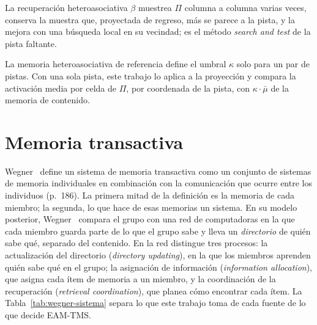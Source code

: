 La recuperación heteroasociativa $\beta$ muestrea $\Pi$ columna a columna varias veces,
conserva la muestra que, proyectada de regreso, más se parece a la pista, y la mejora
con una búsqueda local en su vecindad; es el método \emph{search and test} de la pista
faltante.

La memoria heteroasociativa de referencia define el umbral $\kappa$ solo para un par de
pistas.
Con una sola pista, este trabajo lo aplica a la proyección y compara la activación media
por celda de $\Pi$, por coordenada de la pista, con $\kappa \cdot \bar{\mu}$ de la
memoria de contenido.

\section{Memoria transactiva}
\label{sec:tmt}

Wegner~\cite{wegner1987transactive} define un sistema de memoria transactiva como un
conjunto de sistemas de memoria individuales en combinación con la comunicación que
ocurre entre los individuos (p.~186).
La primera mitad de la definición es la memoria de cada miembro; la segunda, lo que
hace de esas memorias un sistema.
En su modelo posterior, Wegner~\cite{wegner1995computer} compara el grupo con una red
de computadoras en la que cada miembro guarda parte de lo que el grupo sabe y lleva un
\emph{directorio} de quién sabe qué, separado del contenido.
En la red distingue tres procesos: la actualización del directorio (\emph{directory
updating}), en la que los miembros aprenden quién sabe qué en el grupo; la asignación
de información (\emph{information allocation}), que asigna cada ítem de memoria a un
miembro, y la coordinación de la recuperación (\emph{retrieval coordination}), que
planea cómo encontrar cada ítem.
La Tabla~\ref{tab:wegner-sistema} separa lo que este trabajo toma de cada fuente de lo
que decide EAM-TMS.

